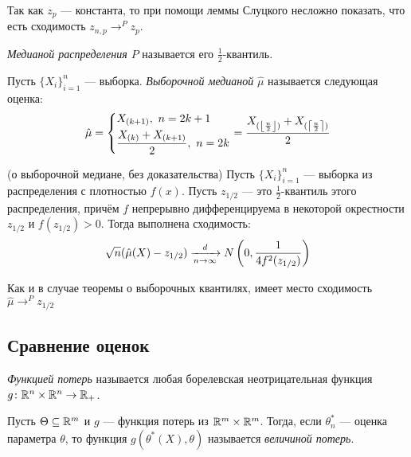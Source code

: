 \begin{note}
	Так как $z_p$ --- константа, то при помощи леммы Слуцкого несложно показать, что есть сходимость $z_{n, p} \to^P z_p$.
\end{note}

\begin{definition}
	\textit{Медианой распределения $P$} называется его $\frac{1}{2}$-квантиль.
\end{definition}

\begin{definition}
	Пусть $\{X_i\}_{i = 1}^n$ --- выборка. \textit{Выборочной медианой} $\hat{\mu}$ называется следующая оценка:
	\[
		\hat{\mu} = \left\{\begin{aligned}
			&{X_{(k + 1)},\ n = 2k + 1}
			\\
			&{\frac{X_{(k)} + X_{(k + 1)}}{2},\ n = 2k}
		\end{aligned}\right. = \frac{X_{(\left\lfloor\frac{n}{2}\right\rfloor)} + X_{(\left\lceil\frac{n}{2}\right\rceil)}}{2}
	\]
\end{definition}

\begin{theorem} (о выборочной медиане, без доказательства)
	Пусть $\{X_i\}_{i = 1}^n$ --- выборка из распределения с плотностью $f(x)$. Пусть $z_{1 / 2}$ --- это $\frac{1}{2}$-квантиль этого распределения, причём $f$ непрерывно дифференцируема в некоторой окрестности $z_{1 / 2}$ и $f(z_{1 / 2}) > 0$. Тогда выполнена сходимость:
	\[
		\sqrt{n}(\hat{\mu}(X) - z_{1 / 2}) \xrightarrow[n \to \infty]{d} N\left(0, \frac{1}{4f^2(z_{1 / 2})}\right)
	\]
\end{theorem}

\begin{note}
	Как и в случае теоремы о выборочных квантилях, имеет место сходимость $\hat{\mu} \to^P z_{1 / 2}$
\end{note}

\subsection{Сравнение оценок}

\begin{definition}
	\textit{Функцией потерь} называется любая борелевская неотрицательная функция $g \colon \mathbb{R}^n \times \mathbb{R}^n \to \mathbb{R}_+$.
\end{definition}

\begin{definition}
	Пусть $\Theta \subseteq \mathbb{R}^m$ и $g$ --- функция потерь из $\mathbb{R}^m \times \mathbb{R}^m$. Тогда, если $\theta_n^*$ --- оценка параметра $\theta$, то функция $g(\theta^*(X), \theta)$ называется \textit{величиной потерь}.
\end{definition}

